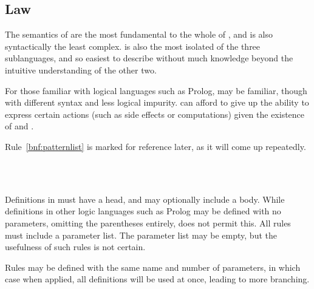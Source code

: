 \subsection{Law}

The semantics of \Law{} are the most fundamental to the whole of \Trilogy{}, and
\Law{} is also syntactically the least complex. \Law{} is also the most isolated
of the three sublanguages, and so easiest to describe without much knowledge beyond
the intuitive understanding of the other two.

For those familiar with logical languages such as Prolog, \Law{} may be
familiar, though with different syntax and less logical impurity. \Law{} can
afford to give up the ability to express certain actions (such as side effects
or computations) given the existence of \Prose{} and \Poetry{}.

Rule~\ref{bnf:patternlist} is marked for reference later, as it will come up
repeatedly.

\begin{bnf}
     \\
     \\
\end{bnf}

Definitions in \Law{} must have a head, and may optionally include a body. While
definitions in other logic languages such as Prolog may be defined with no parameters,
omitting the parentheses entirely, \Law{} does not permit this. All rules must include
a parameter list. The parameter list may be empty, but the usefulness of such rules
is not certain.

Rules may be defined with the same name and number of parameters, in which case when
applied, all definitions will be used at once, leading to more branching.

\begin{prooftree}
\end{prooftree}

